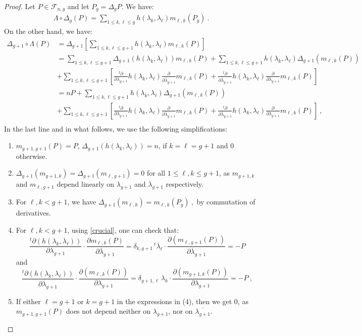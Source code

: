 \documentclass[11pt,letterpaper,english]{amsart}
\numberwithin{equation}{subsection}
\numberwithin{equation}{section}
\newcommand\cF{{\mathcal F}}
\theoremstyle{plain}
\theoremstyle{remark}
\begin{document}
\begin{proof}
Let $P\in \cF_{n,g}$ and let $P_g=\Delta_g P$. We have: 
\begin{align}\label{eq:second-side}
\Lambda\circ\Delta_g (P)=\sum_{1\leq k,\ell\leq g}h(\lambda_k,\lambda_\ell)m_{\ell,k}(P_g)~.
\end{align}
On the other hand, we have:
 \begin{align*}
       \Delta_{g+1}\circ\Lambda( P)&= \Delta_{g+1}\left[\sum_{1\leq k,\ell\leq g+1}h(\lambda_k,\lambda_\ell)m_{\ell,k}(P)\right]\\
       &= \sum_{1\leq k,\ell\leq g+1}\Delta_{g+1}(h(\lambda_k,\lambda_\ell))m_{\ell,k}(P)+\sum_{1\leq k,\ell\leq g+1}h(\lambda_k,\lambda_\ell)\Delta_{g+1}(m_{\ell,k}(P))\\&+\sum_{1\leq k,\ell\leq g+1}\left[{\frac{^t\partial}{\partial \lambda_{g+1}}}h(\lambda_k,\lambda_\ell)\frac{\partial}{\partial \overline{\lambda}_{g+1}}m_{\ell,k}(P)+{\frac{^t\partial}{\partial \overline{\lambda}_{g+1}}}h(\lambda_k,\lambda_\ell)\frac{\partial}{\partial \lambda_{g+1}}m_{\ell,k}(P)\right]\\
       &= nP+\sum_{1\leq k,\ell\leq g+1}h(\lambda_k,\lambda_\ell)\Delta_{g+1}(m_{\ell,k}(P))\\&+\sum_{1\leq k,\ell\leq g+1}\left[{\frac{^t\partial}{\partial \lambda_{g+1}}}h(\lambda_k,\lambda_\ell)\frac{\partial}{\partial \overline{\lambda}_{g+1}}m_{\ell,k}(P)+{\frac{^t\partial}{\partial \overline{\lambda}_{g+1}}}h(\lambda_k,\lambda_\ell)\frac{\partial}{\partial \lambda_{g+1}}m_{\ell,k}(P)\right]~,\\
       \end{align*}
 In the last line and in what follows, we use the following simplifications: 
 \begin{enumerate}
     \item $m_{g+1,g+1}(P)=P$, $\Delta_{g+1}(h(\lambda_k,\lambda_\ell))=n$, if  $k=\ell=g+1$ and $0$ otherwise. 
     \item $\Delta_{g+1}(m_{g+1,k})=\Delta_{g+1}(m_{\ell,g+1})=0$ for all $1\leq \ell,k\leq g+1$, as $m_{g+1,k}$ and $m_{\ell,g+1}$ depend linearly on $\lambda_{g+1}$ and $\overline \lambda_{g+1}$ respectively.  
    \item For $\ell,k<g+1$, we have $\Delta_{g+1}(m_{\ell,k})=m_{\ell,k}(P_g)~,$ by commutation of derivatives.
    \item For $\ell,k<g+1$, using \cref{crucial}, one can check that:
    \[{\frac{^t\partial \left( h(\lambda_k,\lambda_\ell)\right)}{\partial \lambda_{g+1}}} \cdot \frac{\partial m_{\ell,k}(P)}{\partial \overline{\lambda}_{g+1}}=\delta_{k,g+1}  \, {^t\overline{\lambda}_\ell}\cdot \frac{\partial (m_{\ell,g+1}(P))}{\partial \overline{\lambda}_{g+1}}=-P\]
    and 
    \[{\frac{^t\partial(h(\lambda_k,\lambda_\ell))}{\partial \overline{\lambda}_{g+1}}}\cdot \frac{\partial(m_{\ell,k}(P))}{\partial \lambda_{g+1}}=\delta_{g+1,\ell}\, \lambda_k\cdot \frac{\partial (m_{g+1,k}(P))}{\partial \lambda_{g+1}}=-P~,\]
    \item If either $\ell=g+1$ or $k=g+1$ in the expressions in (4), then we get $0$, as $m_{g+1,g+1}(P)$ does not depend neither on $\lambda_{g+1}$, nor on $\overline{\lambda_{g+1}}$.
 \end{enumerate}


\end{proof}
\end{document}
